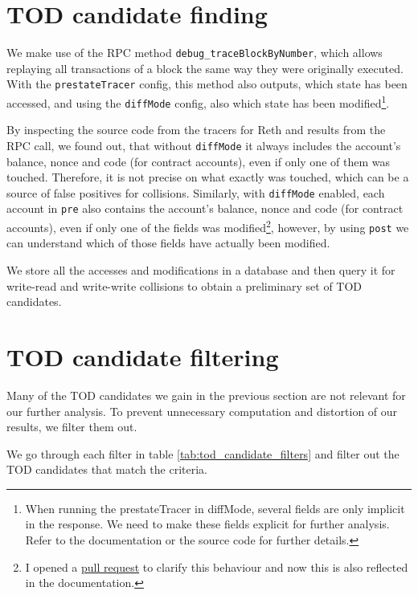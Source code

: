 \documentclass[draft,final]{vutinfth} %
\begin{document}
\section{TOD candidate finding}

We make use of the RPC method \verb|debug_traceBlockByNumber|, which allows replaying all transactions of a block the same way they were originally executed. With the \verb|prestateTracer| config, this method also outputs, which state has been accessed, and using the \verb|diffMode| config, also which state has been modified\footnote{When running the prestateTracer in diffMode, several fields are only implicit in the response. We need to make these fields explicit for further analysis. Refer to the documentation or the source code for further details.}.

By inspecting the source code from the tracers for Reth\cite{noauthor_paradigmxyzrevm-inspectors_2024} and results from the RPC call, we found out, that without \verb|diffMode| it always includes the account's balance, nonce and code (for contract accounts), even if only one of them was touched. Therefore, it is not precise on what exactly was touched, which can be a source of false positives for collisions. Similarly, with \verb|diffMode| enabled, each account in \verb|pre| also contains the account's balance, nonce and code (for contract accounts), even if only one of the fields was modified\footnote{I opened a \href{https://github.com/ethereum/go-ethereum/pull/30081}{pull request} to clarify this behaviour and now this is also reflected in the documentation\cite{noauthor_built-tracers_2024}.}, however, by using \verb|post| we can understand which of those fields have actually been modified.

We store all the accesses and modifications in a database and then query it for write-read and write-write collisions to obtain a preliminary set of TOD candidates.

\section{TOD candidate filtering}

Many of the TOD candidates we gain in the previous section are not relevant for our further analysis. To prevent unnecessary computation and distortion of our results, we filter them out.

We go through each filter in table \ref{tab:tod_candidate_filters} and filter out the TOD candidates that match the criteria.
\end{document}
